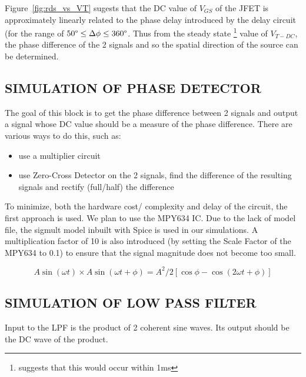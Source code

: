 \documentclass[10pt, conference]{IEEEtran}
\begin{document}
Figure~\ref{fig:rds_vs_VT}  sugests that the DC value of $V_{GS}$ of the JFET is approximately linearly related to the phase delay introduced by the delay circuit (for the range of $50\degree \leq \Delta \phi \leq 360\degree$. Thus from the steady state \footnote{\cite{1031521} suggests that this would occur within 1ms} value of $V_{T-DC}$, the phase difference of the 2 signals and so the spatial direction of the source can be determined.


\subsection{SIMULATION OF PHASE DETECTOR}
The goal of this block is to get the phase difference  between 2 signals and output a signal whose DC value should be a measure of the phase difference. There are various ways to do this, such as:
\begin{itemize}
    \item use a multiplier circuit
    \item use Zero-Cross Detector on the 2 signals, find the difference of the resulting signals and rectify (full/half) the difference 
\end{itemize}
To minimize, both the hardware cost/ complexity and delay of the circuit, the first approach is used. We plan to use the MPY634 IC. Due to the lack of model file, the sigmult model inbuilt with Spice is used in our simulations.
A multiplication factor of 10 is also introduced (by setting the Scale Factor of the MPY634 to 0.1) to ensure that the signal magnitude does not become too small.

\begin{equation*}
    A\sin{(\omega t)}\times A\sin{(\omega t +\phi)}=A^2/2[\cos{\phi} - \cos{(2\omega t + \phi)}]
\end{equation*}

\subsection{SIMULATION OF LOW PASS FILTER}
Input to the LPF is the product of 2 coherent sine waves. Its output should be the DC wave of the product.
\end{document}
